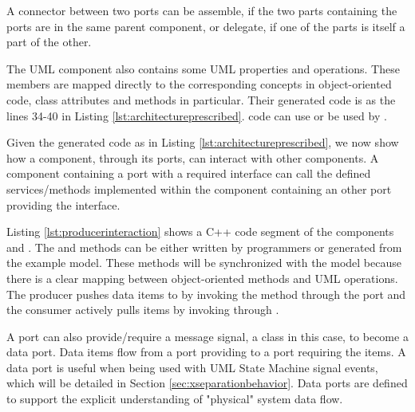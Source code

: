 A connector between two ports can be assemble, if the two parts containing the ports are in the same parent component, or delegate, if one of the parts is itself a part of the other.




The UML  component also contains some UML properties and operations.
These members are mapped directly to the corresponding concepts in object-oriented code, class attributes and methods in particular.
Their generated code is  as the lines 34-40 in Listing \ref{lst:architectureprescribed}.
 code can use or be used by .

\vskip 0.1cm
\noindent
{} Given the generated code as in Listing \ref{lst:architectureprescribed}, we now show how a component, through its ports, can interact with other components.
A component containing a port with a required interface can call the defined services/methods implemented within the component containing an other port providing the interface.

\begin{minipage}{\columnwidth}
	
\end{minipage}

Listing \ref{lst:producerinteraction} shows a C++ code segment of the components  and .
The  and  methods can be either written by programmers or generated from the example model.
These methods will be synchronized with the model because there is a clear mapping between object-oriented methods and UML operations.
The producer pushes data items to  by invoking the  method through the  port and the consumer actively pulls items by invoking  through .


 
\vskip 0.1cm
\noindent
{} 
A port can also provide/require a message signal, a class in this case, to become a data port.
Data items flow from a port providing to a port requiring the items.
A data port is useful when being used with UML State Machine signal events, which will be detailed in Section \ref{sec:xseparationbehavior}.
Data ports are defined to support the explicit understanding of "physical" system data flow. 

